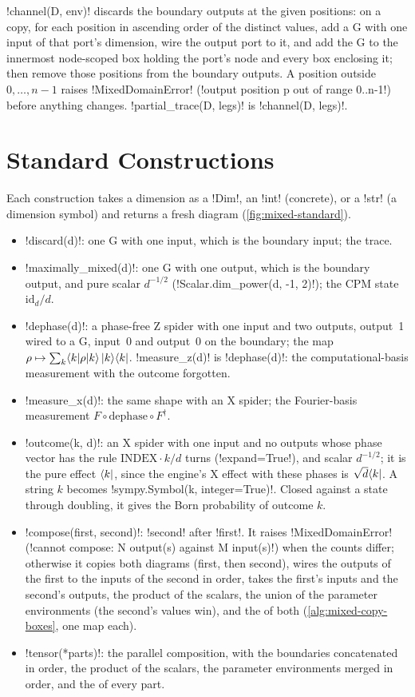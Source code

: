 \py!channel(D, env)! discards the boundary outputs at the given positions: on a copy, for each position in ascending order of the distinct values, add a G with one input of that port's dimension, wire the output port to it, and add the G to the innermost node-scoped box holding the port's node and every box enclosing it; then remove those positions from the boundary outputs. A position outside $0,\dots,n-1$ raises \py!MixedDomainError! (\code!output position p out of range 0..n-1!) before anything changes. \py!partial_trace(D, legs)! is \py!channel(D, legs)!.

\section{Standard Constructions}\label{sec:mixed-standard}

Each construction takes a dimension as a \py!Dim!, an \py!int! (concrete), or a \py!str! (a dimension symbol) and returns a fresh diagram (\cref{fig:mixed-standard}).

\begin{itemize}
\item \py!discard(d)!: one G with one input, which is the boundary input; the trace.
\item \py!maximally_mixed(d)!: one G with one output, which is the boundary output, and pure scalar $d^{-1/2}$ (\py!Scalar.dim_power(d, -1, 2)!); the CPM state $\mathrm{id}_d/d$.
\item \py!dephase(d)!: a phase-free Z spider with one input and two outputs, output~1 wired to a G, input~0 and output~0 on the boundary; the map $\rho\mapsto\sum_k\langle k \rvert\rho\lvert k \rangle\,\lvert k \rangle\langle k \rvert$. \py!measure_z(d)! is \py!dephase(d)!: the computational-basis measurement with the outcome forgotten.
\item \py!measure_x(d)!: the same shape with an X spider; the Fourier-basis measurement $F\circ\mathrm{dephase}\circ F^\dagger$.
\item \py!outcome(k, d)!: an X spider with one input and no outputs whose phase vector has the rule $\mathrm{INDEX}\cdot k/d$ turns (\py!expand=True!), and scalar $d^{-1/2}$; it is the pure effect $\langle k \rvert$, since the engine's X effect with these phases is $\sqrt d\langle k \rvert$. A string $k$ becomes \py!sympy.Symbol(k, integer=True)!. Closed against a state through doubling, it gives the Born probability of outcome $k$.
\item \py!compose(first, second)!: \py!second! after \py!first!. It raises \py!MixedDomainError! (\code!cannot compose: N output(s) against M input(s)!) when the counts differ; otherwise it copies both diagrams (first, then second), wires the outputs of the first to the inputs of the second in order, takes the first's inputs and the second's outputs, the product of the scalars, the union of the parameter environments (the second's values win), and the \bboxes{} of both (\cref{alg:mixed-copy-boxes}, one map each).
\item \py!tensor(*parts)!: the parallel composition, with the boundaries concatenated in order, the product of the scalars, the parameter environments merged in order, and the \bboxes{} of every part.
\end{itemize}

